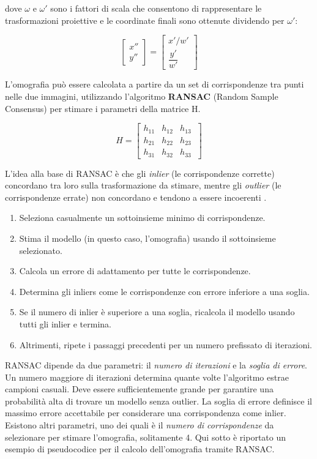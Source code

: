 dove $\omega$ e $\omega'$ sono i fattori di scala che consentono di rappresentare le trasformazioni proiettive e le coordinate finali sono ottenute dividendo per $\omega'$:

$$
\begin{bmatrix} x'' \\ y'' \end{bmatrix} = \begin{bmatrix} {x'}/{w'} \\ \dfrac {y'} {w'} \end{bmatrix}
$$

L'omografia può essere calcolata a partire da un set di corrispondenze tra punti nelle due immagini, utilizzando l'algoritmo \textbf{RANSAC} (Random Sample Consensus) per stimare i parametri della matrice H.

$$
H = \begin{bmatrix} h_{11} & h_{12} & h_{13} \\ h_{21} & h_{22} & h_{23} \\ h_{31} & h_{32} & h_{33} \ \end{bmatrix}
$$

L'idea alla base di RANSAC è che gli \textit{inlier} (le corrispondenze corrette) concordano tra loro sulla trasformazione da stimare, mentre gli \textit{outlier} (le corrispondenze errate) non concordano e tendono a essere incoerenti \cite{ransac}. 

\begin{enumerate}
    \item Seleziona casualmente un sottoinsieme minimo di corrispondenze. 
    \item Stima il modello (in questo caso, l'omografia) usando il sottoinsieme selezionato.
    \item Calcola un errore di adattamento per tutte le corrispondenze. 
    \item Determina gli inliers come le corrispondenze con errore inferiore a una soglia.
    \item Se il numero di inlier è superiore a una soglia, ricalcola il modello usando tutti gli inlier e termina. 
    \item Altrimenti, ripete i passaggi precedenti per un numero prefissato di iterazioni. 
\end{enumerate}

RANSAC dipende da due parametri: il \textit{numero di iterazioni} e la \textit{soglia di errore}. Un numero maggiore di iterazioni determina quante volte l'algoritmo estrae campioni casuali. Deve essere sufficientemente grande per garantire una probabilità alta di trovare un modello senza outlier. La soglia di errore definisce il massimo errore accettabile per considerare una corrispondenza come inlier. Esistono altri parametri, uno dei quali è il \textit{numero di corrispondenze} da selezionare per stimare l'omografia, solitamente 4. Qui sotto è riportato un esempio di pseudocodice per il calcolo dell'omografia tramite RANSAC.

